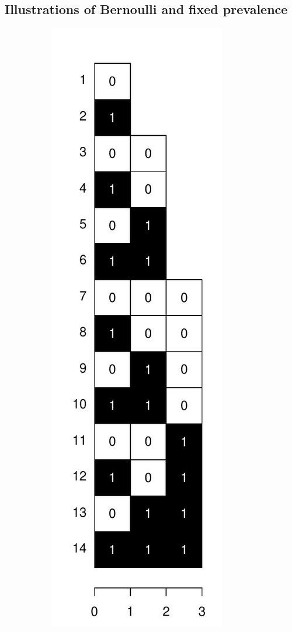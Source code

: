 \documentclass{bmcart}
\begin{document}
\subsection{Illustrations of Bernoulli and fixed prevalence}
\begin{figure}
    \centering
    \begin{subfigure}[b]{0.3\textwidth}
        \includegraphics[width=\textwidth]{Figures/BernTraj.pdf}

\end{subfigure}
\end{figure}
\end{document}
